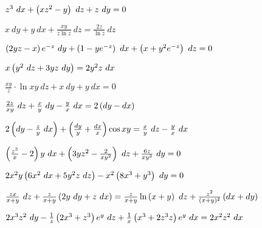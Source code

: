 	\begin{enumtasks}

		\label{nonlinsys_pfaff:int_factor}
		\item \( z^3 ~ dx + \left( xz^2 - y \right) ~ dz + z ~ dy = 0 \) 	 																					%
		\item \( x ~dy + y ~dx + \frac{x y}{z \ln{z}} ~ dz = \frac{2 z}{\ln{z}} ~dz \) 	 																%
		\item \( \left( 2yz - x \right) e^{-z} ~ dy + \left( 1 - ye^{-z} \right) ~ dx + \left( x + y^2 e^{-z} \right) ~ dz = 0 \) 	 											%
		\item \( x \left( y^2 ~ dz + 3 yz ~ dy \right) = 2 y^2 z ~ dx \) 	 																					%
		\item \( \frac{xy}{z} \cdot \ln{xy} ~dz + x ~dy + y ~dx = 0 \) 	 																				%
		\item \( \frac{2z}{xy} ~ dz + \frac{x}{y} ~ dy - \frac{y}{x} ~ dx = 2 \left( dy - dx \right) \) 	 														%
		\item \( 2 \left( dy - \frac{z}{y} ~ dx \right) + \left( \frac{dy}{y} + \frac{dx}{x} \right) \cos{xy} = \frac{x}{y} ~ dz - \frac{y}{x} ~ dx \) 					%
		\item \( \left( \frac{z^3}{x} - 2 \right) y ~ dx + \left( 3yz^2 - \frac{2}{xy^2} \right) ~ dz + \frac{6z}{xy^3} ~ dy = 0 \) 									%
		\item \( 2x^2 y \left( 6 x^2 ~ dx + 5y^2 z ~ dz \right) - x^2 \left( 8 x^3 + y^3 \right) ~ dy = 0 \) 	 														%
		\item \( \frac{zx}{x+y} ~ dz + \frac{z}{x+y}\left( 2y ~ dy + z ~ dx \right) = \frac{z}{x+y}\ln\left( x+y \right) ~ dz + \frac{z^2}{(x+y)^2} \left( dx + dy \right) \)	%
		\item \( 2x^3 z^2 ~ dy - \frac{1}{z}\left( 2x^3 + z^3 \right) e^y ~ dz + \frac{1}{x} \left( x^3 + 2z^3z \right) e^{y} ~ dx = 2x^2 z^2 ~ dx \) 						%
		

\end{enumtasks}
